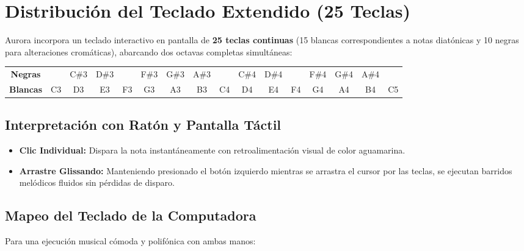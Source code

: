 \documentclass[11pt,a4paper]{article}
\begin{document}
\section{Distribución del Teclado Extendido (25 Teclas)}

Aurora incorpora un teclado interactivo en pantalla de \textbf{25 teclas continuas} (15 blancas correspondientes a notas diatónicas y 10 negras para alteraciones cromáticas), abarcando dos octavas completas simultáneas:

\begin{center}
{\footnotesize
\setlength{\tabcolsep}{3.5pt}
\begin{tabular}{cccccccccccccccc}
\toprule
\textbf{Negras} & & C\#3 & D\#3 & & F\#3 & G\#3 & A\#3 & & C\#4 & D\#4 & & F\#4 & G\#4 & A\#4 & \\
\textbf{Blancas} & C3 & D3 & E3 & F3 & G3 & A3 & B3 & C4 & D4 & E4 & F4 & G4 & A4 & B4 & C5 \\
\bottomrule
\end{tabular}
}
\end{center}

\subsection{Interpretación con Ratón y Pantalla Táctil}
\begin{itemize}[leftmargin=1.5cm]
    \item \textbf{Clic Individual:} Dispara la nota instantáneamente con retroalimentación visual de color aguamarina.
    \item \textbf{Arrastre Glissando:} Manteniendo presionado el botón izquierdo mientras se arrastra el cursor por las teclas, se ejecutan barridos melódicos fluidos sin pérdidas de disparo.
\end{itemize}

\subsection{Mapeo del Teclado de la Computadora}
Para una ejecución musical cómoda y polifónica con ambas manos:
\end{document}
